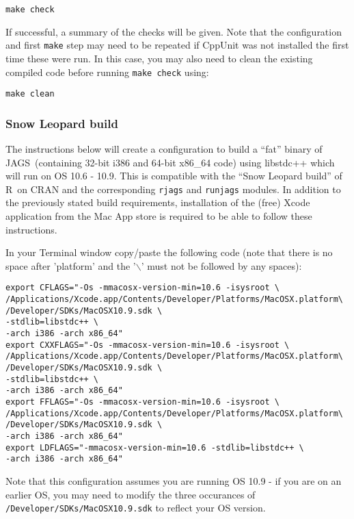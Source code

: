 \documentclass[11pt, a4paper, titlepage]{article}
\newcommand{\JAGS}{\textsf{JAGS}}
\newcommand{\R}{\textsf{R}}
\begin{document}
\begin{verbatim} 
make check
\end{verbatim} 

If successful, a summary of the checks will be given.  Note that the configuration and
first \texttt{make} step may need to be repeated if CppUnit was not installed the first
time these were run.  In this case, you may also need to clean the existing 
compiled code before running \texttt{make check} using:

\begin{verbatim} 
make clean
\end{verbatim} 


\subsubsection{Snow Leopard build}

The instructions below will
create a configuration to build a ``fat'' binary of \JAGS\ (containing
32-bit i386 and 64-bit x86\_64 code) using libstdc++ which will run on
OS 10.6 - 10.9.  This is compatible with the ``Snow Leopard build'' of
\R\ on CRAN and the corresponding \texttt{rjags} and \texttt{runjags} modules. 
In addition to the previously stated build requirements, installation of 
the (free) Xcode application from the Mac App store is required to be
able to follow these instructions.

In your Terminal window copy/paste the following code (note that there is no
space after 'platform' and the '$\backslash$' must not be followed by
any spaces): 

\begin{verbatim}
export CFLAGS="-Os -mmacosx-version-min=10.6 -isysroot \
/Applications/Xcode.app/Contents/Developer/Platforms/MacOSX.platform\
/Developer/SDKs/MacOSX10.9.sdk \
-stdlib=libstdc++ \
-arch i386 -arch x86_64"
export CXXFLAGS="-Os -mmacosx-version-min=10.6 -isysroot \
/Applications/Xcode.app/Contents/Developer/Platforms/MacOSX.platform\
/Developer/SDKs/MacOSX10.9.sdk \
-stdlib=libstdc++ \
-arch i386 -arch x86_64"
export FFLAGS="-Os -mmacosx-version-min=10.6 -isysroot \
/Applications/Xcode.app/Contents/Developer/Platforms/MacOSX.platform\
/Developer/SDKs/MacOSX10.9.sdk \
-arch i386 -arch x86_64"
export LDFLAGS="-mmacosx-version-min=10.6 -stdlib=libstdc++ \
-arch i386 -arch x86_64"
\end{verbatim}

Note that this configuration assumes you are running OS 10.9 - if you 
are on an earlier OS, you may need to modify the three occurances of 
\texttt{/Developer/SDKs/MacOSX10.9.sdk} to reflect your OS version.
\end{document}
